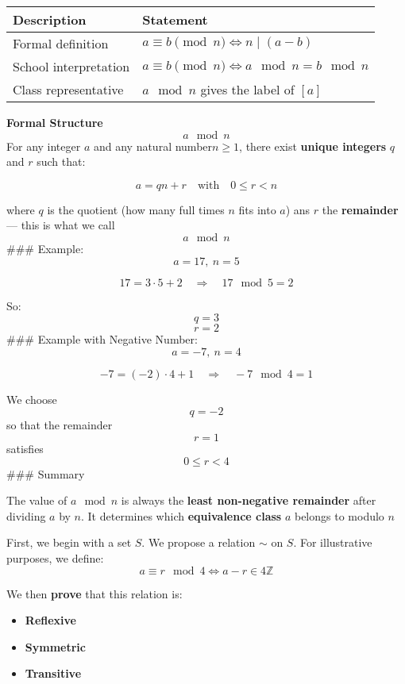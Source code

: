 \documentclass[]{article}
\providecommand{\tightlist}{%
  \setlength{\itemsep}{0pt}\setlength{\parskip}{0pt}}
\begin{document}
\begin{longtable}[]{@{}
  >{\raggedright\arraybackslash}p{}
  >{\raggedright\arraybackslash}p{}@{}}
\toprule\noalign{}
\begin{minipage}[b]{\linewidth}\raggedright
Description
\end{minipage} & \begin{minipage}[b]{\linewidth}\raggedright
Statement
\end{minipage} \\
\midrule\noalign{}
\endhead
\bottomrule\noalign{}
\endlastfoot
Formal definition & \(a \equiv b \pmod{n} \iff n \mid (a - b)\) \\
School interpretation &
\(a \equiv b \pmod{n} \iff a \mod n = b \mod n\) \\
Class representative & \(a \mod n\) gives the label of \([a]\) \\
\end{longtable}

\textbf{Formal Structure} \[a \mod n\] For any integer \(a\) and any
natural number\(n \geq 1\), there exist \textbf{unique integers} \(q\)
and \(r\) such that:

\[ a = qn + r \quad \text{with} \quad 0 \leq r < n\]

where \(q\) is the quotient (how many full times \(n\) fits into \(a\))
ans \(r\) the \textbf{remainder} --- this is what we call \[a \mod n\]
\#\#\# Example: \[a = 17, \ n = 5\]

\[
17 = 3 \cdot 5 + 2 \quad \Rightarrow \quad 17 \mod 5 = 2
\]

So: \[q = 3\] \[r = 2\] \#\#\# Example with Negative Number:
\[a = -7, \ n = 4\]

\[
-7 = (-2) \cdot 4 + 1 \quad \Rightarrow \quad -7 \mod 4 = 1
\]

We choose \[q = -2\] so that the remainder \[r = 1\] satisfies
\[0 \leq r < 4\] \#\#\# Summary

The value of \(a \mod n\) is always the \textbf{least non-negative
remainder} after dividing \(a\) by \(n\). It determines which
\textbf{equivalence class} \(a\) belongs to modulo \(n\)

First, we begin with a set \(S\). We propose a relation \(\sim\) on
\(S\). For illustrative purposes, we define: \[
a \equiv r \mod 4 \iff a - r \in 4\mathbb{Z}
\]

We then \textbf{prove} that this relation is:

\begin{itemize}
\tightlist
\item
  \textbf{Reflexive}
\item
  \textbf{Symmetric}
\item
  \textbf{Transitive}
\end{itemize}
\end{document}
